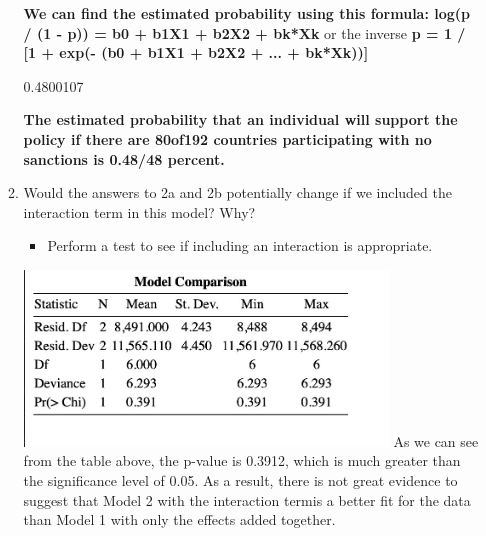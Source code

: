 \documentclass[12pt,letterpaper]{article}
\begin{document}
\begin{enumerate}
\begin{enumerate}
\textbf{\textbf{We can find the estimated probability using this formula:}	log(p / (1 - p)) = b0 + b1X1 + b2X2 + bk*Xk} 
or the inverse \textbf{p = 1 / [1 + exp(- (b0 + b1X1 + b2X2 + ... + bk*Xk))]}
		 

0.4800107

\textbf{The estimated probability that an individual will support the policy if there are 80of192 countries participating with no sanctions is 0.48/48 percent.}
\vspace{.8cm}
		\item
		Would the answers to 2a and 2b potentially change if we included the interaction term in this model? Why? 
		\begin{itemize}
			\item Perform a test to see if including an interaction is appropriate.
		\end{itemize}
		 
		\includegraphics[width=0.8\textwidth]{model_comparison.jpg}
		\linebreak
As we can see from the table above, the p-value is 0.3912, which is much greater than the significance level of 0.05. As a result, there is not great evidence to suggest that Model 2 with the interaction termis a better fit for the data than Model 1 with only the effects added together. 
	
	\end{enumerate}
	\end{enumerate}
\end{document}
